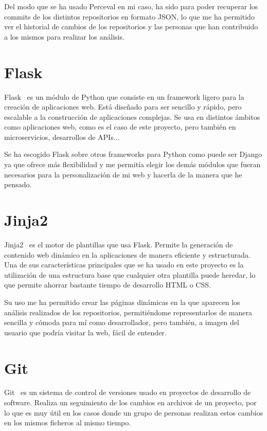 \documentclass[a4paper, 12pt]{book}
\begin{document}
Del modo que se ha usado Perceval en mi caso, ha sido para poder recuperar los commits de los distintos repositorios en formato JSON, lo que me ha permitido ver el historial de cambios de los repositorios y las personas que han contribuido a los mismos para realizar los análisis.
\section{Flask}
 \label{sec:Flask}

Flask~\cite{flask:_flask} es un módulo de Python que consiste en un framework ligero para la creación de aplicaciones web. Está diseñado para ser sencillo y rápido, pero escalable a la construcción de aplicaciones complejas. Se usa en distintos ámbitos como aplicaciones web, como es el caso de este proyecto, pero también en microservicios, desarrollos de APIs...

Se ha escogido Flask sobre otros frameworks para Python como puede ser Django ya que ofrece más flexibilidad y me permitía elegir los demás módulos que fueran necesarios para la personalización de mi web y hacerla de la manera que he pensado.

\section{Jinja2}
\label{sec:Jinja2}

Jinja2~\cite{jinja:_jinja} es el motor de plantillas que usa Flask. Permite la generación de contenido web dinámico en la aplicaciones de manera eficiente y estructurada. Una de sus características principales que se ha usado en este proyecto es la utilización de una estructura base que cualquier otra plantilla puede heredar, lo que permite ahorrar bastante tiempo de desarrollo HTML o CSS.

Su uso me ha permitido crear las páginas dinámicas en la que aparecen los análisis realizados de los repositorios, permitiéndome representarlos de manera sencilla y cómoda para mí como desarrollador, pero también, a imagen del usuario que podría visitar la web, fácil de entender. 

\section{Git}
\label{sec:Git}

Git~\cite{git:_git}  es un sistema de control de versiones usado en proyectos de desarrollo de software. Realiza un seguimiento de los cambios en archivos de un proyecto, por lo que es muy útil en los casos donde un grupo de personas realizan estos cambios en los mismos ficheros al mismo tiempo.
\end{document}
